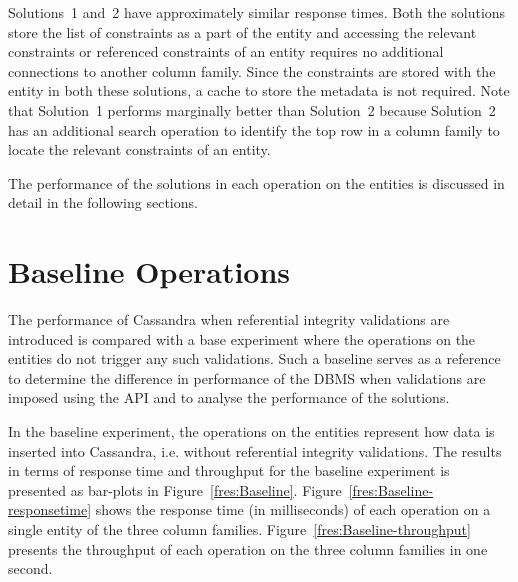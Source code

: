 Solutions~1 and~2 have approximately similar response times. Both the solutions
store the list of constraints as a part of the entity and accessing the relevant
constraints or referenced constraints of an entity requires no additional
connections to another column family. Since the constraints are stored with the
entity in both these solutions, a cache to store the metadata is not required.
Note that Solution~1 performs marginally better than Solution~2 
because Solution~2 has an additional search operation to identify the top row in a
column family to locate the relevant constraints of an entity.



The performance of the solutions in each
operation on the entities is discussed in detail in the following sections.
 

\section{Baseline Operations} \label{s:results-Baseline}

The performance of Cassandra when referential
integrity validations are introduced  is compared with
 a base experiment where the operations on the entities do not trigger any
such validations. Such a baseline serves as a reference to determine the
difference in performance of the \ac{DBMS} when validations are imposed using
the \ac{API} and to analyse the performance of the solutions.

In the baseline experiment, the operations on the entities represent how data is
inserted into Cassandra, i.e. without referential integrity validations.
The results in terms of response time and throughput for the baseline experiment
is presented as  bar-plots in Figure~\ref{fres:Baseline}.
Figure~\ref{fres:Baseline-responsetime} shows the response time (in
milliseconds) of each operation on a single entity of the three column families.
Figure~\ref{fres:Baseline-throughput} presents the throughput of each operation
on the three column families in one second. 

	
